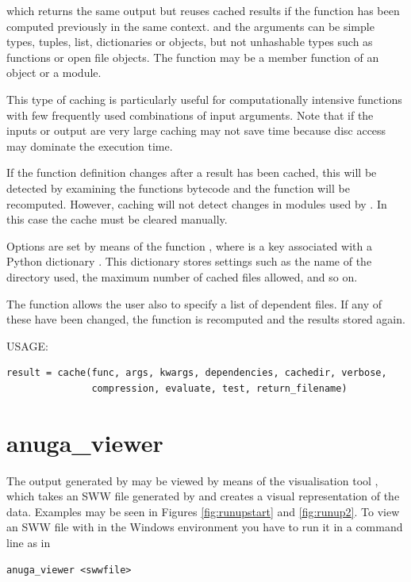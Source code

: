 \documentclass{manual}
\begin{document}
which returns the same output but reuses cached
results if the function has been computed previously in the same context.
 and the arguments can be simple types, tuples, list, dictionaries or
objects, but not unhashable types such as functions or open file objects.
The function  may be a member function of an object or a module.

This type of caching is particularly useful for computationally intensive
functions with few frequently used combinations of input arguments. Note that
if the inputs or output are very large caching may not save time because
disc access may dominate the execution time.

If the function definition changes after a result has been cached, this will be
detected by examining the functions bytecode and the function will be recomputed.
However, caching will not detect changes in modules used by .
In this case the cache must be cleared manually.

Options are set by means of the function ,
where  is a key associated with a
Python dictionary . This dictionary stores settings such as the name of
the directory used, the maximum number of cached files allowed, and so on.

The  function allows the user also to specify a list of dependent files. If any of these
have been changed, the function is recomputed and the results stored again.


USAGE: \nopagebreak

\begin{verbatim}
result = cache(func, args, kwargs, dependencies, cachedir, verbose,
               compression, evaluate, test, return_filename)
\end{verbatim}



\pagebreak
\section{anuga\_viewer}
\label{sec:anuga_viewer}

The output generated by \anuga may be viewed by
means of the visualisation tool , which takes an
SWW file generated by \anuga and creates a visual representation
of the data. Examples may be seen in Figures \ref{fig:runupstart}
and \ref{fig:runup2}. To view an SWW file with
 in the Windows environment you have to run it in a command line as in
\begin{verbatim}
anuga_viewer <swwfile>
\end{verbatim} 
\end{document}

